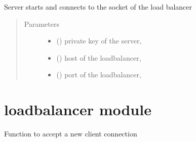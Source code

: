 \documentclass[letterpaper,10pt,english]{sphinxmanual}
\begin{document}
\begin{fulllineitems}
\label{\detokenize{startServer:startServer.startServer}}
Server starts and connects to the socket of the load balancer
\begin{quote}\begin{description}
\item[{Parameters}] \leavevmode\begin{itemize}
\item {} 
 (\sphinxstyleliteralemphasis{\sphinxupquote{,}}) \textendash{} private key of the server,

\item {} 
 (\sphinxstyleliteralemphasis{\sphinxupquote{,}}) \textendash{} host of the loadbalancer,

\item {} 
 () \textendash{} port of the loadbalancer,

\end{itemize}

\end{description}\end{quote}

\end{fulllineitems}



\section{loadbalancer module}
\label{\detokenize{loadbalancer:module-loadbalancer}}\label{\detokenize{loadbalancer:loadbalancer-module}}\label{\detokenize{loadbalancer::doc}}

\begin{fulllineitems}
\label{\detokenize{loadbalancer:loadbalancer.accept}}
Function to accept a new client connection

\end{fulllineitems}
\end{document}
